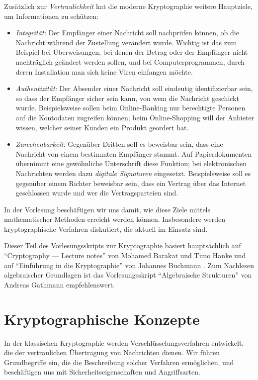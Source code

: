 Zusätzlich zur \emph{Vertraulichkeit} hat die moderne Kryptographie weitere Hauptziele, um Informationen zu schützen:
\begin{itemize}
  \item \emph{Integrität:} Der Empfänger einer Nachricht soll nachprüfen können, ob die Nachricht während der Zustellung verändert wurde. Wichtig ist das zum Beispiel bei Überweisungen, bei denen der Betrag oder der Empfänger nicht nachträglich geändert werden sollen, und bei Computerprogrammen, durch deren Installation man sich keine Viren einfangen möchte.    
 \item \emph{Authentizität:} Der Absender einer Nachricht soll eindeutig identifizierbar sein, so dass der Empfänger sicher sein kann, von wem die Nachricht geschickt wurde. Beispielsweise sollen beim Online-Banking nur berechtigte Personen auf die Kontodaten zugreifen können; beim Online-Shopping will der Anbieter wissen, welcher seiner Kunden ein Produkt geordert hat.
 \item \emph{Zurechenbarkeit:} Gegenüber Dritten soll es beweisbar sein, dass eine Nachricht von einem bestimmten Empfänger stammt. Auf Papierdokumenten übernimmt eine gewöhnliche Unterschrift diese Funktion; bei elektronischen Nachrichten werden dazu \emph{digitale Signaturen} eingesetzt. Beispielsweise soll es gegenüber einem Richter beweisbar sein, dass ein Vertrag über das Internet geschlossen wurde und wer die Vertragsparteien sind.
\end{itemize}

In der Vorlesung beschäftigen wir uns damit, wie diese Ziele mittels mathematischer Methoden erreicht werden können. Insbesondere werden kryptographische Verfahren diskutiert, die aktuell im Einsatz sind. 

Dieser Teil des Vorlesungsskripts zur Kryptographie basiert hauptsächlich auf \enquote{Cryptography --- Lecture notes} von Mohamed Barakat und Timo Hanke \cite{barakat12}
und auf \enquote{Einführung in die Kryptographie} von Johannes Buchmann 
\cite{buchmann99}
. Zum Nachlesen algebraischer Grundlagen ist das Vorlesungsskript \enquote{Algebraische Strukturen} von Andreas Gathmann \cite{gathmann2010} empfehlenswert.

\chapter{Kryptographische Konzepte}

In der klassischen Kryptographie werden Verschlüsselungsverfahren entwickelt, die der vertraulichen Übertragung von Nachrichten dienen. Wir führen Grundbegriffe ein, die die Beschreibung solcher Verfahren ermöglichen, und beschäftigen uns mit Sicherheitseigenschaften und Angriffsarten.

